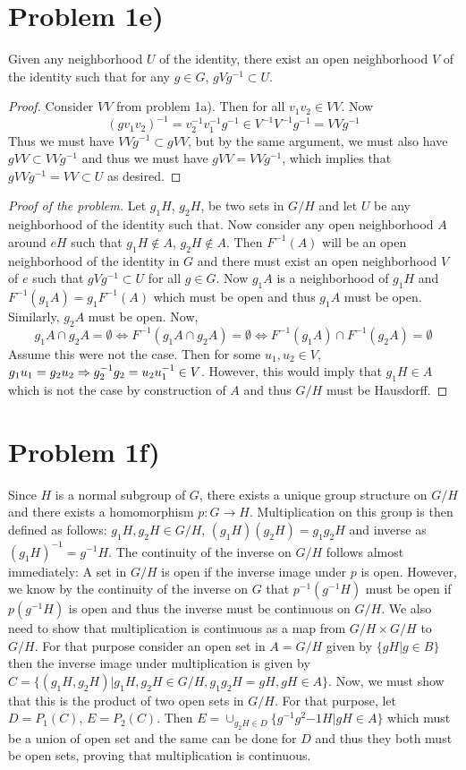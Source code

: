 \section*{Problem 1e)}
\begin{lemma}
Given any neighborhood $U$ of the identity, there exist an open neighborhood $V$ of the identity such that for any $g\in G$, $gVg^{-1} \subset U$.
\begin{proof}
Consider $VV$ from problem 1a). Then for all $v_1v_2\in VV$.
Now
\[ (gv_1v_2)^{-1} = v_2^{-1}v_1^{-1}g^{-1} \in V^{-1}V^{-1}g^{-1} = VVg^{-1} \]
Thus we must have $VVg^{-1}  \subset gVV$, but by the same argument, we must also have $gVV  \subset  VVg^{-1}$ and thus we must have $gVV = VVg^{-1}$, which implies that $gVVg^{-1}=VV\subset U$ as desired.
\end{proof}
\end{lemma}
\begin{proof}[Proof of the problem]
Let $g_1H$, $g_2H$, be two sets in $G/H$ and let $U$ be any neighborhood of the identity such that. Now consider any open neighborhood $A$ around $eH$ such that $g_1H\notin A$, $g_2H\notin A$. Then $F^{-1}(A)$ will be an open neighborhood of the identity in $G$ and there must exist an open neighborhood $V$ of $e$ such that $gVg^{-1}\subset U$ for all $g\in G$. Now $g_1A$ is a neighborhood of $g_1H$ and $F^{-1}(g_1A) = g_1F^{-1}(A)$ which must be open and thus $g_1A$ must be open. Similarly, $g_2A$ must be open. Now, 
\[ g_1A\cap g_2A = \emptyset \iff F^{-1}(g_1A\cap g_2A ) = \emptyset \iff F^{-1}(g_1A) \cap F^{-1}(g_2A) = \emptyset \]
Assume this were not the case. Then for some $u_1,u_2\in V$,
$g_1u_1 = g_2u_2 \Rightarrow g_2^{-1}g_2 = u_2u_1^{-1} \in V$. However, this would imply that $g_1H\in A$ which is not the case by construction of $A$ and thus $G/H$ must be Hausdorff.
\end{proof}
\section*{Problem 1f)}
Since $H$ is a normal subgroup of $G$, there exists a unique group structure on $G/H$ and there exists a homomorphism $p: G\to H$. Multiplication on this group is then defined as follows: $g_1H, g_2H \in G/H$, $(g_1H)(g_2H) = g_1g_2H$ and inverse as $(g_1H)^{-1} = g^{-1}H$. The continuity of the inverse on $G/H$ follows almost immediately: A set in $G/H$ is open if the inverse image under $p$ is open. However, we know by the continuity of the inverse on $G$ that $p^{-1}(g^{-1}H)$ must be open if $p(g^{-1}H)$ is open and thus the inverse must be continuous on $G/H$. We also need to show that multiplication is continuous as a map from $G/H\times G/H$ to $G/H$. For that purpose consider an open set in $A=G/H$ given by $\{gH | g\in B\}$ then the inverse image under multiplication is given by $C=\{(g_1H,g_2H) | g_1H,g_2H \in G/H, g_1g_2H = gH, gH\in A\}$. Now, we must show that this is the product of two open sets in $G/H$. For that purpose, let $D=P_1(C)$, $E=P_2(C)$. Then $E=\cup_{g_2H\in D} \{ g^{-1}g^2{-1}H | gH \in A \}$ which must be a union of open set and the same can be done for $D$ and thus they both must be open sets, proving that multiplication is continuous.
